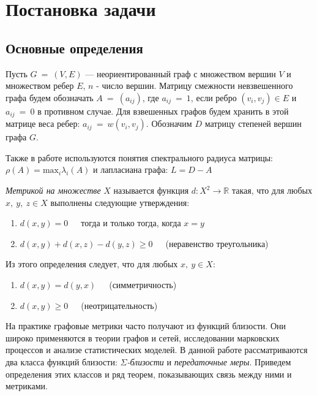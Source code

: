 \chapter{Постановка задачи} \label{chapt1}

\section{Основные определения} \label{sect1_1}

Пусть $G~=~(V, E)$ --- неориентированный граф с множеством вершин $V$ и множеством ребер $E$, $n$ - число вершин. Матрицу смежности невзвешенного графа будем обозначать $A~=~(a_{ij})$, где $a_{ij}~=~1$, если ребро $(v_i, v_j) \in E$ и $a_{ij}~=~0$ в противном случае. Для взвешенных графов будем хранить в этой матрице веса ребер: $a_{ij}~=~w(v_i, v_j)$. Обозначим $D$ матрицу степеней вершин графа $G$.

Также в работе используются понятия спектрального радиуса матрицы: $\rho(A) = \text{max}_i \lambda_i(A)$ и лапласиана графа: $L = D - A$

\begin{definition}
\emph{Метрикой на множестве} $X$ называется функция $d: X^2\rightarrow \mathbb{R}$ такая, что для любых $x,\ y,\ z \in X$ выполнены следующие утверждения:
\begin{enumerate}
\item $d(x,y) = 0$\ \ \  тогда и только тогда, когда $x=y$
\item $d(x,y) + d(x,z) - d(y,z) \ge 0$\ \ \  (неравенство треугольника)
\end{enumerate}
\end{definition}

Из этого определения следует, что для любых $x,\ y \in X$:

\begin{enumerate}
\item $d(x,y) = d(y,x)$\ \ \ (симметричность)
\item $d(x,y) \ge 0$\ \ \  (неотрицательность)
\end{enumerate}


На практике графовые метрики часто получают из функций близости. Они широко применяются в теории графов и сетей, исследовании марковских процессов и анализе статистических моделей. В данной работе рассматриваются два класса функций близости: $\Sigma$\emph{-близости} и \emph{передаточные меры}. Приведем определения этих классов и ряд теорем, показывающих связь между ними и метриками.

